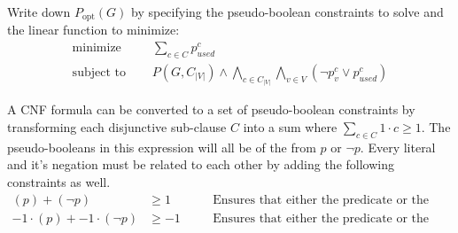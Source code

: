 \documentclass{article}
\newenvironment{solution}{\color{blue} \em }{}
\begin{document}
\begin{enumerate}
	Write down  $P_{\text{opt}}(G)$ by specifying the pseudo-boolean constraints to solve and the linear function to minimize:
    \begin{solution}
	\begin{align*}
        \text{minimize}  	 \quad& \sum_{c \in C} p^c_{used} \\
    \text{subject to } \quad& P(G, C_{|V|}) \land \bigwedge_{c \in C_{|V|}} \bigwedge_{v \in V} (\neg p_v^c \lor p_{used}^c)
	\end{align*}

	A CNF formula can be converted to a set of pseudo-boolean constraints by transforming each disjunctive sub-clause $C$ into a sum where $\sum_{c \in C} 1 \cdot c \geq 1$. The pseudo-booleans in this expression will all be of the from $p$ or $\neg p$. Every literal and it's negation must be related to each other by adding the following constraints as well.
	\begin{align*}
	(p) + (\neg p) &\geq 1 \quad&& \text{Ensures that either the predicate or the negation is true}\\
	-1 \cdot (p) + -1 \cdot (\neg p) &\geq -1 \quad&& \text{Ensures that either the predicate or the negation is false}
	\end{align*}
    \end{solution}

\end{enumerate}
\end{document}
